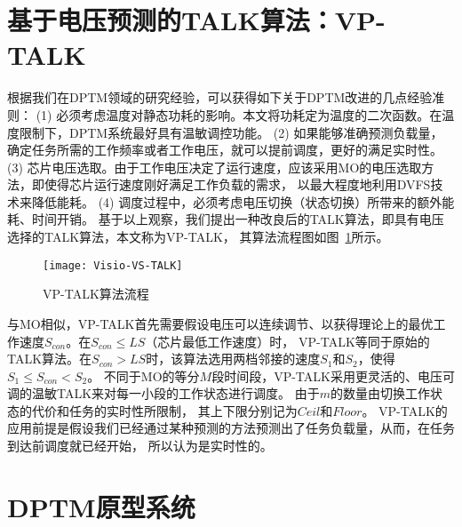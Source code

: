 \section{基于电压预测的TALK算法：VP-TALK}
\label{sec:vp-talk}
根据我们在DPTM领域的研究经验，可以获得如下关于DPTM改进的几点经验准则：
(1)	必须考虑温度对静态功耗的影响。本文将功耗定为温度的二次函数。在温度限制下，DPTM系统最好具有温敏调控功能。
(2)	如果能够准确预测负载量，确定任务所需的工作频率或者工作电压，就可以提前调度，更好的满足实时性。
(3)	芯片电压选取。由于工作电压决定了运行速度，应该采用MO的电压选取方法，即使得芯片运行速度刚好满足工作负载的需求， 以最大程度地利用DVFS技术来降低能耗。
(4)	调度过程中，必须考虑电压切换（状态切换）所带来的额外能耗、时间开销。
基于以上观察，我们提出一种改良后的TALK算法，即具有电压选择的TALK算法，本文称为VP-TALK， 其算法流程图如图~\ref{fig:vp-talk}所示。
\begin{figure}[H] %
  \centering
  \texttt{[image: Visio-VS-TALK]}
  \caption{VP-TALK算法流程}
  \label{fig:vp-talk}
\end{figure}
与MO相似，VP-TALK首先需要假设电压可以连续调节、以获得理论上的最优工作速度$S_{con}$。在$S_{con}\leq LS$（芯片最低工作速度）时， VP-TALK等同于原始的TALK算法。在$S_{con}>{LS}$时，该算法选用两档邻接的速度$S_1$和$S_2$，使得$S_1\leq S_{con}<S_2$。 不同于MO的等分$M$段时间段，VP-TALK采用更灵活的、电压可调的温敏TALK来对每一小段的工作状态进行调度。 由于$m$的数量由切换工作状态的代价和任务的实时性所限制， 其上下限分别记为$Ceil$和$Floor$。 VP-TALK的应用前提是假设我们已经通过某种预测的方法预测出了任务负载量，从而，在任务到达前调度就已经开始， 所以认为是实时性的。

\section{DPTM原型系统}
\label{DPTM-system}

